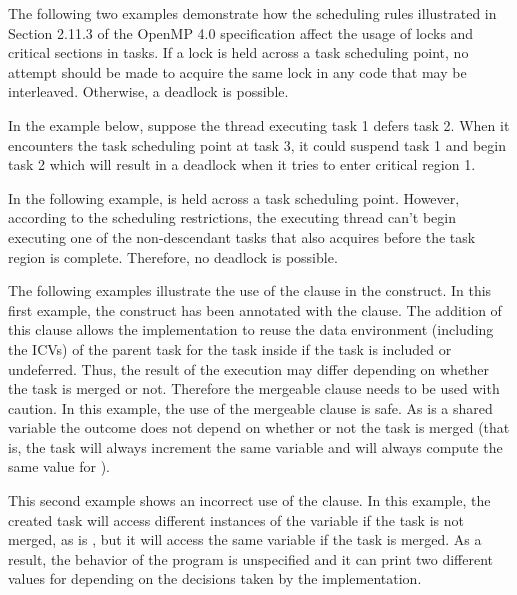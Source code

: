 The following two examples demonstrate how the scheduling rules illustrated in 
Section 2.11.3 of the OpenMP 4.0 specification affect the usage of locks 
and critical sections in tasks.  If a lock is held 
across a task scheduling point, no attempt should be made to acquire the same lock 
in any code that may be interleaved.  Otherwise, a deadlock is possible.

In the example below, suppose the thread executing task 1 defers task 2.  When 
it encounters the task scheduling point at task 3, it could suspend task 1 and 
begin task 2 which will result in a deadlock when it tries to enter critical region 
1.




In the following example,  is held across a task scheduling point. 
 However, according to the scheduling restrictions, the executing thread can't 
begin executing one of the non-descendant tasks that also acquires  before 
the task region is complete.  Therefore, no deadlock is possible.


\clearpage

The following examples illustrate the use of the  clause in the 
 construct. In this first example, the  construct has 
been annotated with the   clause. The addition of this clause 
allows the implementation to reuse the data environment (including the ICVs) of 
the parent task for the task inside  if the task is included or undeferred. 
Thus, the result of the execution may differ depending on whether the task is merged 
or not. Therefore the mergeable clause needs to be used with caution. In this example, 
the use of the mergeable clause is safe. As  is a shared variable the 
outcome does not depend on whether or not the task is merged (that is, the task 
will always increment the same variable and will always compute the same value 
for ).



This second example shows an incorrect use of the  clause. In 
this example, the created task will access different instances of the variable 
 if the task is not merged, as  is , but 
it will access the same variable  if the task is merged. As a result, 
the behavior of the program is unspecified and it can print two different values 
for  depending on the decisions taken by the implementation.

